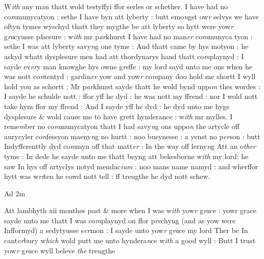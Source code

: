 \documentclass[12pt, a4paper]{book}
\begin{document}
		\ifthenelse{\isodd{\thepage}}
		{\reversemarginpar}
		{\normalmarginpar}
		W\textit{ith} any man thatt wold testyffyi ffor serles or schether. I have
had no co\textit{m}munycatyon : sethe I have byn att lyberty :
butt emo\textit{n}gst ow\textit{r} selvys we have oftyn tymes wyschyd
thatt they mygthe be att lyberty so hytt were yow\textit{r }g\textit{ra}cyusse 
p\textit{l}aesure : w\textit{ith} mr p\textit{ar}khurst I have had no man\textit{er} co\textit{m}munyca
tyon : sethe I was att
			 lyberty savy\textit{n}g one tyme : And thatt
came by hys motyon : he askyd whatt dysplesure men
had att thordynarys hand thatt co\textit{m}playnyd : I sayde ev\textit{er}y man
knowghe hys owne g\textit{re}ffe : my lord sayd unto me ons when 
he was nott co\textit{n}tentyd : gardin\textit{er} yow and yow\textit{r} co\textit{m}pany doo hold me
shortt I wyll hold you as schortt : Mr p\textit{ar}khurst sayde thatt
he wold bynd uppo\textit{n} thes wordes : I sayde he schulde nott : ffor
yff he dyd : he was nott my ffrend : nor I wold nott take
hym ffor my ffrend : And I sayde yff he dyd : he dyd
unto me hyge dysplesure \& wold cause me to have grett
hynderance : w\textit{ith} mr mylles. I reme\textit{m}ber no co\textit{m}munycatyon thatt
I had savy\textit{n}g ons uppo\textit{n} the artycle off aurycyler co\textit{n}fessyon
maeny\textit{n}g no hurtt : noo busynesse : a yenst no p\textit{er}son : butt
Indyfferenttly dyd co\textit{m}myn off that matt\textit{er} : In the way off lerny\textit{n}g
Att an o\textit{ther} tyme : In dede he sayde unto me thatt beyng att 
bekesborne w\textit{ith} my lord: he saw In hys off artyclys notyd
mendac\textit{ium} : noo mans name namyd : and wherffor hytt was
w\textit{ri}ten he cowd nott tell : ff treugthe he dyd nott schew.

            		
		\ifthenelse{\isodd{\thepage}}
		{\reversemarginpar}
		{\normalmarginpar}
		Ad 2m
            			
		\ifthenelse{\isodd{\thepage}}
		{\reversemarginpar}
		{\normalmarginpar}
		Att lambhyth xii monthes past \& more
			 when I was w\textit{ith} yow\textit{r} g\textit{ra}ce : yowr grace
sayde unto me thatt I was co\textit{m}playnyd on ffor p\textit{re}chyng (and as 
yow were Infformyd) a sedytyusse s\textit{er}mon : I sayde unto yow\textit{r} g\textit{ra}ce 
my lord Ther be In cant\textit{er}bury w\textit{hich} wold putt me unto hyndera\textit{n}ce
w\textit{ith} a good wyll : Butt I trust yow\textit{r} g\textit{ra}ce wyll beleve \textit{the }treugthe
\end{document}
